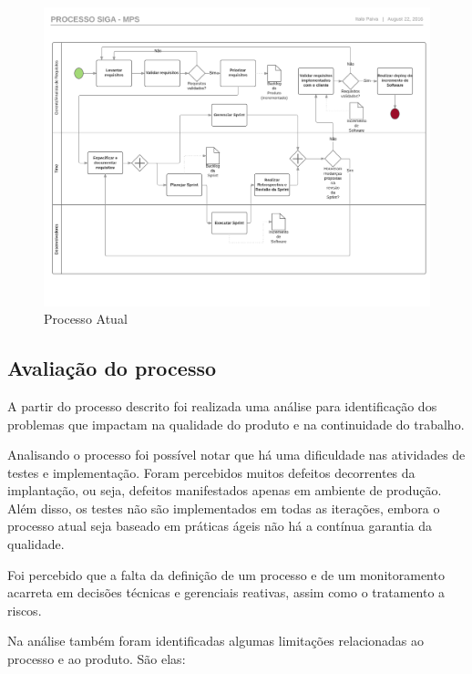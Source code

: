 \begin{figure}[!ht]
\centering
\includegraphics[scale=0.5]{figuras/processo_atual.png}
\caption{Processo Atual}
\label{fig:processo_atual}
\end{figure}


\subsection{Avaliação do processo}


A partir do processo descrito foi realizada uma análise para identificação dos problemas que impactam na qualidade do produto 
e na continuidade do trabalho. 

Analisando o processo foi possível notar que há uma dificuldade nas atividades de testes e implementação. Foram percebidos
muitos defeitos decorrentes da implantação, ou seja, defeitos manifestados apenas em ambiente de produção. Além disso, 
os testes não são implementados em todas as iterações, embora o processo atual seja baseado em práticas ágeis não há a 
contínua garantia da qualidade.

Foi percebido que a falta da definição de um processo e de um monitoramento acarreta em 
decisões técnicas e gerenciais reativas, assim como o tratamento a riscos. 

Na análise também foram identificadas algumas limitações relacionadas ao processo e ao produto. São elas: 

